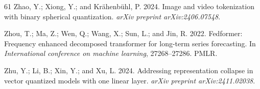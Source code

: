\documentclass[letterpaper]{article} %
\begin{document}
\begin{thebibliography}{61}
Zhao, Y.; Xiong, Y.; and Kr{\"a}henb{\"u}hl, P. 2024.
\newblock Image and video tokenization with binary spherical quantization.
\newblock \emph{arXiv preprint arXiv:2406.07548}.

Zhou, T.; Ma, Z.; Wen, Q.; Wang, X.; Sun, L.; and Jin, R. 2022.
\newblock Fedformer: Frequency enhanced decomposed transformer for long-term
  series forecasting.
\newblock In \emph{International conference on machine learning}, 27268--27286.
  PMLR.

Zhu, Y.; Li, B.; Xin, Y.; and Xu, L. 2024.
\newblock Addressing representation collapse in vector quantized models with
  one linear layer.
\newblock \emph{arXiv preprint arXiv:2411.02038}.

\end{thebibliography}

\clearpage
\appendix

\setcounter{secnumdepth}{1}


\end{document}
